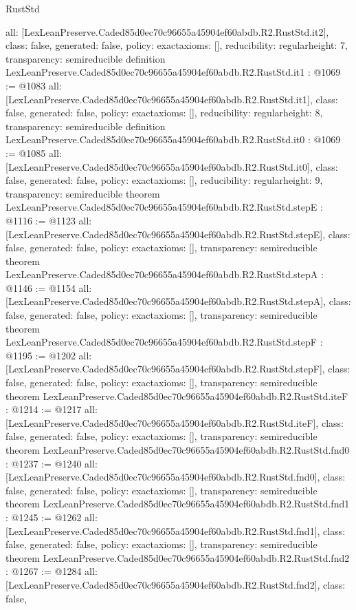 \begin{lexlean}{RustStd}
\begin{coremodule}
{  all: [LexLeanPreserve.Caded85d0ec70c96655a45904ef60abdb.R2.RustStd.it2],
  class: false,
  generated: false,
  policy: exact{axioms: []},
  reducibility: regular{height: 7},
  transparency: semireducible
}
definition LexLeanPreserve.Caded85d0ec70c96655a45904ef60abdb.R2.RustStd.it1 : @1069 := @1083 {
  all: [LexLeanPreserve.Caded85d0ec70c96655a45904ef60abdb.R2.RustStd.it1],
  class: false,
  generated: false,
  policy: exact{axioms: []},
  reducibility: regular{height: 8},
  transparency: semireducible
}
definition LexLeanPreserve.Caded85d0ec70c96655a45904ef60abdb.R2.RustStd.it0 : @1069 := @1085 {
  all: [LexLeanPreserve.Caded85d0ec70c96655a45904ef60abdb.R2.RustStd.it0],
  class: false,
  generated: false,
  policy: exact{axioms: []},
  reducibility: regular{height: 9},
  transparency: semireducible
}
theorem LexLeanPreserve.Caded85d0ec70c96655a45904ef60abdb.R2.RustStd.stepE : @1116 := @1123 {
  all: [LexLeanPreserve.Caded85d0ec70c96655a45904ef60abdb.R2.RustStd.stepE],
  class: false,
  generated: false,
  policy: exact{axioms: []},
  transparency: semireducible
}
theorem LexLeanPreserve.Caded85d0ec70c96655a45904ef60abdb.R2.RustStd.stepA : @1146 := @1154 {
  all: [LexLeanPreserve.Caded85d0ec70c96655a45904ef60abdb.R2.RustStd.stepA],
  class: false,
  generated: false,
  policy: exact{axioms: []},
  transparency: semireducible
}
theorem LexLeanPreserve.Caded85d0ec70c96655a45904ef60abdb.R2.RustStd.stepF : @1195 := @1202 {
  all: [LexLeanPreserve.Caded85d0ec70c96655a45904ef60abdb.R2.RustStd.stepF],
  class: false,
  generated: false,
  policy: exact{axioms: []},
  transparency: semireducible
}
theorem LexLeanPreserve.Caded85d0ec70c96655a45904ef60abdb.R2.RustStd.iteF : @1214 := @1217 {
  all: [LexLeanPreserve.Caded85d0ec70c96655a45904ef60abdb.R2.RustStd.iteF],
  class: false,
  generated: false,
  policy: exact{axioms: []},
  transparency: semireducible
}
theorem LexLeanPreserve.Caded85d0ec70c96655a45904ef60abdb.R2.RustStd.fnd0 : @1237 := @1240 {
  all: [LexLeanPreserve.Caded85d0ec70c96655a45904ef60abdb.R2.RustStd.fnd0],
  class: false,
  generated: false,
  policy: exact{axioms: []},
  transparency: semireducible
}
theorem LexLeanPreserve.Caded85d0ec70c96655a45904ef60abdb.R2.RustStd.fnd1 : @1245 := @1262 {
  all: [LexLeanPreserve.Caded85d0ec70c96655a45904ef60abdb.R2.RustStd.fnd1],
  class: false,
  generated: false,
  policy: exact{axioms: []},
  transparency: semireducible
}
theorem LexLeanPreserve.Caded85d0ec70c96655a45904ef60abdb.R2.RustStd.fnd2 : @1267 := @1284 {
  all: [LexLeanPreserve.Caded85d0ec70c96655a45904ef60abdb.R2.RustStd.fnd2],
  class: false,
}
\end{coremodule}
\end{lexlean}
